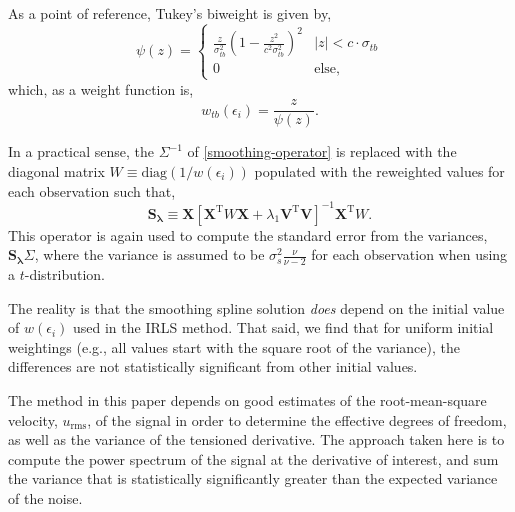 \documentclass{ametsoc}
\begin{document}
As a point of reference, Tukey's biweight is given by,
\begin{equation}
\psi(z) = 
\begin{cases}
\frac{z}{\sigma_{tb}^2} \left(1-\frac{z^2}{c^2 \sigma_{tb}^2} \right)^2 & |z| < c \cdot \sigma_{tb} \\
0 & \textrm{else},
\end{cases}
\end{equation}
which, as a weight function is,
\begin{equation}
    w_{tb}(\epsilon_i) = \frac{z}{\psi(z)}.
\end{equation}

In a practical sense, the $\Sigma^{-1}$ of \eqref{smoothing-operator} is replaced with the diagonal matrix $W\equiv\textrm{diag}(1/w(\epsilon_i))$ populated with the reweighted values for each observation such that,
\begin{equation}
\label{general-smoothing-operator}
\mathbf{S_\lambda} \equiv \mathbf{X} \left[ \mathbf{X}^{\textrm{T}} W \mathbf{X} + \lambda_1 \mathbf{V}^{\textrm{T}} \mathbf{V} \right]^{-1} \mathbf{X}^{\textrm{T}} W.
\end{equation}
This operator is again used to compute the standard error from the variances,  $\mathbf{S_\lambda} \Sigma$, where the variance is assumed to be $\sigma_s^2 \frac{\nu}{\nu-2}$ for each observation when using a $t$-distribution.

The reality is that the smoothing spline solution \emph{does} depend on the initial value of $w(\epsilon_i)$ used in the IRLS method. That said, we find that for uniform initial weightings (e.g., all values start with the square root of the variance), the differences are not statistically significant from other initial values.

\appendix[B]
\label{sec:variance_estimate}

The method in this paper depends on good estimates of the root-mean-square velocity, $u_{\textrm{rms}}$, of the signal in order to determine the effective degrees of freedom, as well as the variance of the tensioned derivative. The approach taken here is to compute the power spectrum of the signal at the derivative of interest, and sum the variance that is statistically significantly greater than the expected variance of the noise.
\end{document}
